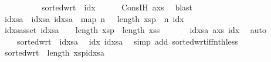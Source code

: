 \begin{isabellebody}
\ \ \ \ \ \ \ \ \ \ {\isachardoublequoteopen}sorted{\isacharunderscore}{\kern0pt}wrt\ {\isacharparenleft}{\kern0pt}{\isacharless}{\kern0pt}{\isacharparenright}{\kern0pt}\ idx{\isachardoublequoteclose}\isanewline
\ \ \ \ \isamarkupfalse%
\ Cons{\isachardot}{\kern0pt}IH\ a{\isacharunderscore}{\kern0pt}xs\ \isamarkupfalse%
\ blast\isanewline
\isanewline
\ \ \isamarkupfalse%
\ idxsa\ \ idxsa{\isacharcolon}{\kern0pt}\ {\isachardoublequoteopen}idxsa\ {\isacharequal}{\kern0pt}\ {\isacharparenleft}{\kern0pt}map\ {\isacharparenleft}{\kern0pt}{\isasymlambda}n{\isachardot}{\kern0pt}\ {}\ {\isacharplus}{\kern0pt}\ length\ xsp\ {\isacharplus}{\kern0pt}\ n{\isacharparenright}{\kern0pt}\ idx{\isacharparenright}{\kern0pt}{\isachardoublequoteclose}\isanewline
\ \ \isamarkupfalse%
\ idxsa{\isacharunderscore}{\kern0pt}s{\isacharcolon}{\kern0pt}{\isachardoublequoteopen}set\ idxsa\ {\isasymsubseteq}\ {\isacharbraceleft}{\kern0pt}{\isachardot}{\kern0pt}{\isachardot}{\kern0pt}{\isacharless}{\kern0pt}{\isacharparenleft}{\kern0pt}{}\ {\isacharplus}{\kern0pt}\ length\ xsp\ {\isacharplus}{\kern0pt}\ length\ xss{\isacharparenright}{\kern0pt}{\isacharbraceright}{\kern0pt}{\isachardoublequoteclose}\ \isanewline
\ \ \ \ \isamarkupfalse%
\ idxsa\ a{\isacharunderscore}{\kern0pt}xs{\isacharparenleft}{\kern0pt}{}{\isacharparenright}{\kern0pt}\ idx{\isacharparenleft}{\kern0pt}{}{\isacharparenright}{\kern0pt}\ \isamarkupfalse%
\ auto\isanewline
\ \ \isamarkupfalse%
\ \ \ \ {\isachardoublequoteopen}sorted{\isacharunderscore}{\kern0pt}wrt\ {\isacharparenleft}{\kern0pt}{\isacharless}{\kern0pt}{\isacharparenright}{\kern0pt}\ idxsa{\isachardoublequoteclose}\ \isamarkupfalse%
\ idx{\isacharparenleft}{\kern0pt}{}{\isacharparenright}{\kern0pt}\ idxsa\ \isamarkupfalse%
\ {\isacharparenleft}{\kern0pt}simp\ add{\isacharcolon}{\kern0pt}\ sorted{\isacharunderscore}{\kern0pt}wrt{\isacharunderscore}{\kern0pt}iff{\isacharunderscore}{\kern0pt}nth{\isacharunderscore}{\kern0pt}less{\isacharparenright}{\kern0pt}\isanewline
\ \ \isamarkupfalse%
\ {}{\isacharcolon}{\kern0pt}{\isachardoublequoteopen}sorted{\isacharunderscore}{\kern0pt}wrt\ {\isacharparenleft}{\kern0pt}{\isacharless}{\kern0pt}{\isacharparenright}{\kern0pt}\ {\isacharparenleft}{\kern0pt}{\isacharparenleft}{\kern0pt}length\ xsp{\isacharparenright}{\kern0pt}{\isacharhash}{\kern0pt}idxsa{\isacharparenright}{\kern0pt}{\isachardoublequoteclose}\ \isamarkupfalse%

\end{isabellebody}
